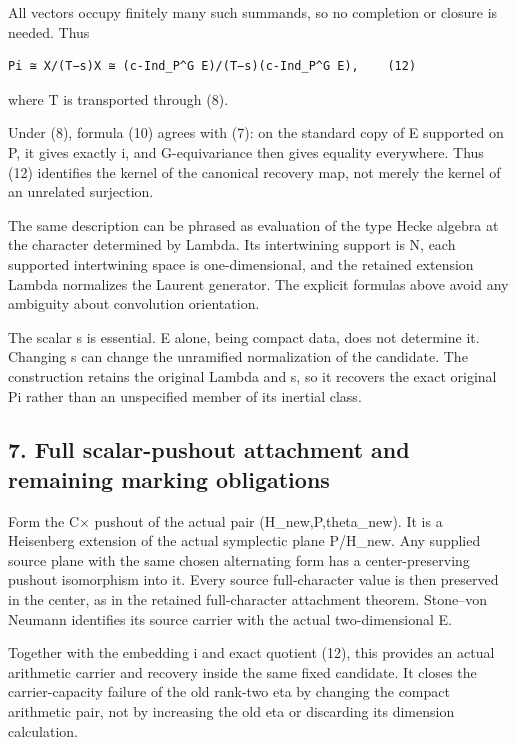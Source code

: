 All vectors occupy finitely many such summands, so no completion or
closure is needed. Thus

\begin{Verbatim}[fontsize=\small,breaklines=true,breakanywhere=true]
Pi ≅ X/(T−s)X ≅ (c-Ind_P^G E)/(T−s)(c-Ind_P^G E),    (12)
\end{Verbatim}

where T is transported through (8).

Under (8), formula (10) agrees with (7): on the standard copy of E
supported on P, it gives exactly i, and G-equivariance then gives
equality everywhere. Thus (12) identifies the kernel of the canonical
recovery map, not merely the kernel of an unrelated surjection.

The same description can be phrased as evaluation of the type Hecke
algebra at the character determined by Lambda. Its intertwining support
is N, each supported intertwining space is one-dimensional, and the
retained extension Lambda normalizes the Laurent generator. The explicit
formulas above avoid any ambiguity about convolution orientation.

The scalar s is essential. E alone, being compact data, does not
determine it. Changing s can change the unramified normalization of the
candidate. The construction retains the original Lambda and s, so it
recovers the exact original Pi rather than an unspecified member of its
inertial class.

\hypertarget{rank2-full-scalar-pushout-attachment-and-remaining-marking-obligations}{%
\subsection{7. Full scalar-pushout attachment and remaining marking
obligations}\label{rank2-full-scalar-pushout-attachment-and-remaining-marking-obligations}}

Form the C× pushout of the actual pair (H\_new,P,theta\_new). It is a
Heisenberg extension of the actual symplectic plane P/H\_new. Any
supplied source plane with the same chosen alternating form has a
center-preserving pushout isomorphism into it. Every source
full-character value is then preserved in the center, as in the retained
full-character attachment theorem. Stone--von Neumann identifies its
source carrier with the actual two-dimensional E.

Together with the embedding i and exact quotient (12), this provides an
actual arithmetic carrier and recovery inside the same fixed candidate.
It closes the carrier-capacity failure of the old rank-two eta by
changing the compact arithmetic pair, not by increasing the old eta or
discarding its dimension calculation.

